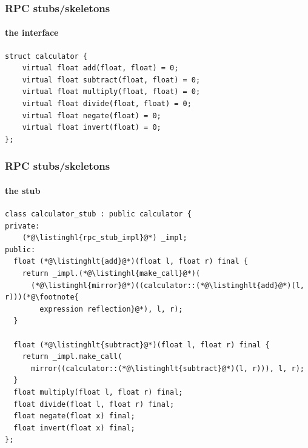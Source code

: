 \documentclass[compress,table,xcolor=table]{beamer}
\begin{document}
\begin{frame}[fragile]
  \frametitle{RPC stubs/skeletons}
  \framesubtitle{the interface}
  \begin{lstlisting}[language=c++2x,basicstyle=\small\ttfamily]
struct calculator {
    virtual float add(float, float) = 0;
    virtual float subtract(float, float) = 0;
    virtual float multiply(float, float) = 0;
    virtual float divide(float, float) = 0;
    virtual float negate(float) = 0;
    virtual float invert(float) = 0;
};
  \end{lstlisting}
\end{frame}
\begin{frame}[fragile]
  \frametitle{RPC stubs/skeletons}
  \framesubtitle{the stub}
  \begin{lstlisting}[language=c++2x,basicstyle=\footnotesize\ttfamily]
class calculator_stub : public calculator {
private:
    (*@\listinghl{rpc_stub_impl}@*) _impl;
public:
  float (*@\listinghlt{add}@*)(float l, float r) final {
    return _impl.(*@\listinghl{make_call}@*)(
      (*@\listinghl{mirror}@*)((calculator::(*@\listinghlt{add}@*)(l, r)))(*@\footnote{
        expression reflection}@*), l, r);
  }

  float (*@\listinghlt{subtract}@*)(float l, float r) final {
    return _impl.make_call(
      mirror((calculator::(*@\listinghlt{subtract}@*)(l, r))), l, r);
  }
  float multiply(float l, float r) final;
  float divide(float l, float r) final;
  float negate(float x) final;
  float invert(float x) final;
};
  \end{lstlisting}
\end{frame}
\end{document}
